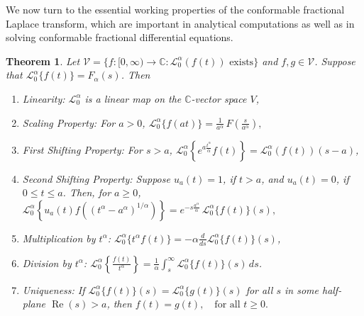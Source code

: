 \documentclass[two side,reqno,12pt]{amsart}
\numberwithin{equation}{section}
\newtheorem{theorem}[lemma]{Theorem}
\theoremstyle{definition}
\begin{document}
\medskip
\noindent
We now turn to the essential working properties of the conformable fractional Laplace transform, which are important in analytical computations as well as in solving conformable fractional differential equations.
\begin{theorem}
Let \(\mathcal{V}= \{ f : [0, \infty) \to \mathbb{C} : \mathcal{L}_0^\alpha(f(t)) \text{ exists} \} \) and \( f,g \in \mathcal{V} \). Suppose that
\(\mathcal{L}_0^\alpha \{ f(t) \} = F_\alpha(s) \). Then  
\begin{enumerate} \setlength{\itemsep}{4pt}
     \item{Linearity:}  
     $\mathcal{L}_{0}^{\alpha}$ is a linear map on the $\mathbb{C}$-vector space $V$,

    \item{Scaling Property:}
     For \( a > 0 \),
    \( \mathcal{L}_0^\alpha \{ f(at) \} = \frac{1}{a^\alpha} \, F\!\left( \frac{s}{a^\alpha} \right),\)

     \item{First Shifting Property:}
     For \( s > a \), \(\mathcal{L}_0^\alpha \left\{ e^{a\frac{t^\alpha}{\alpha}} f(t) \right\} = \mathcal{L}_{0}^{\alpha}(f(t))(s - a)\),

      \item{Second Shifting Property:}
      Suppose \( u_a(t) = 1 \), if \( t > a \), and \( u_a(t) = 0 \), if \( 0 \leq t \leq a \).
      Then, for \( a \geq 0 \), \(\mathcal{L}_0^\alpha \left\{ u_a(t) f\!\left( (t^\alpha - a^\alpha)^{1/\alpha} \right) \right\} = e^{-s\frac {a^\alpha}{\alpha}} \, \mathcal{L}_0^\alpha \{ f(t) \}(s),\)

      \item{Multiplication by $t^{\alpha}$:}
      \(\mathcal{L}_0^\alpha \{ t^\alpha f(t) \} = -\alpha \frac{d}{ds}\mathcal{L}_0^\alpha \{ f(t) \}(s) \),

      \item{Division by $t^{\alpha}$:}
      \(\mathcal{L}_0^\alpha \left\{ \frac{f(t)}{t^\alpha} \right\} = \frac{1}{\alpha} \int_s^\infty  \mathcal{L}_0^\alpha \{ f(t) \}(s) \, ds \).

      \item {Uniqueness:}
      If \(\mathcal{L}_0^\alpha \{ f(t) \}(s) = \mathcal{L}_0^\alpha \{ g(t) \}(s)\)
      for all \( s \) in some half-plane \( \operatorname{Re}(s) > a \),
      then \(f(t) = g(t), \quad \text{for all } t \geq 0.\)
    \end{enumerate}
\end{theorem}
\end{document}

